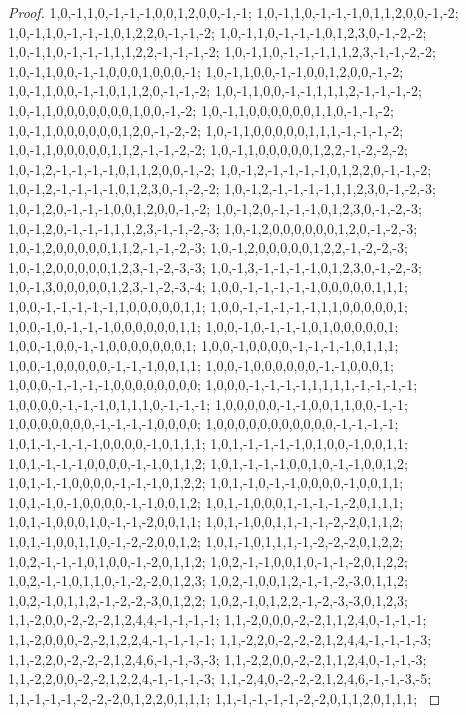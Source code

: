\documentclass{article}
\begin{document}
\begin{proof}
{{1,0,-1,1,0,-1,-1,-1,0,0,1,2,0,0,-1,-1; 1,0,-1,1,0,-1,-1,-1,0,1,1,2,0,0,-1,-2; 1,0,-1,1,0,-1,-1,-1,0,1,2,2,0,-1,-1,-2; 1,0,-1,1,0,-1,-1,-1,0,1,2,3,0,-1,-2,-2; 1,0,-1,1,0,-1,-1,-1,1,1,2,2,-1,-1,-1,-2; 1,0,-1,1,0,-1,-1,-1,1,1,2,3,-1,-1,-2,-2; 1,0,-1,1,0,0,-1,-1,0,0,0,1,0,0,0,-1; 1,0,-1,1,0,0,-1,-1,0,0,1,2,0,0,-1,-2; 1,0,-1,1,0,0,-1,-1,0,1,1,2,0,-1,-1,-2; 1,0,-1,1,0,0,-1,-1,1,1,1,2,-1,-1,-1,-2; 1,0,-1,1,0,0,0,0,0,0,0,1,0,0,-1,-2; 1,0,-1,1,0,0,0,0,0,0,1,1,0,-1,-1,-2;
1,0,-1,1,0,0,0,0,0,0,1,2,0,-1,-2,-2; 1,0,-1,1,0,0,0,0,0,1,1,1,-1,-1,-1,-2; 1,0,-1,1,0,0,0,0,0,1,1,2,-1,-1,-2,-2; 1,0,-1,1,0,0,0,0,0,1,2,2,-1,-2,-2,-2; 1,0,-1,2,-1,-1,-1,-1,0,1,1,2,0,0,-1,-2; 1,0,-1,2,-1,-1,-1,-1,0,1,2,2,0,-1,-1,-2; 1,0,-1,2,-1,-1,-1,-1,0,1,2,3,0,-1,-2,-2; 1,0,-1,2,-1,-1,-1,-1,1,1,2,3,0,-1,-2,-3; 1,0,-1,2,0,-1,-1,-1,0,0,1,2,0,0,-1,-2; 1,0,-1,2,0,-1,-1,-1,0,1,2,3,0,-1,-2,-3; 1,0,-1,2,0,-1,-1,-1,1,1,2,3,-1,-1,-2,-3; 1,0,-1,2,0,0,0,0,0,0,1,2,0,-1,-2,-3;
1,0,-1,2,0,0,0,0,0,1,1,2,-1,-1,-2,-3; 1,0,-1,2,0,0,0,0,0,1,2,2,-1,-2,-2,-3; 1,0,-1,2,0,0,0,0,0,1,2,3,-1,-2,-3,-3; 1,0,-1,3,-1,-1,-1,-1,0,1,2,3,0,-1,-2,-3; 1,0,-1,3,0,0,0,0,0,1,2,3,-1,-2,-3,-4; 1,0,0,-1,-1,-1,-1,-1,0,0,0,0,0,1,1,1; 1,0,0,-1,-1,-1,-1,-1,1,0,0,0,0,0,1,1; 1,0,0,-1,-1,-1,-1,-1,1,1,0,0,0,0,0,1; 1,0,0,-1,0,-1,-1,-1,0,0,0,0,0,0,1,1; 1,0,0,-1,0,-1,-1,-1,0,1,0,0,0,0,0,1; 1,0,0,-1,0,0,-1,-1,0,0,0,0,0,0,0,1; 1,0,0,-1,0,0,0,0,-1,-1,-1,-1,0,1,1,1;
1,0,0,-1,0,0,0,0,0,-1,-1,-1,0,0,1,1; 1,0,0,-1,0,0,0,0,0,0,-1,-1,0,0,0,1; 1,0,0,0,-1,-1,-1,-1,0,0,0,0,0,0,0,0; 1,0,0,0,-1,-1,-1,-1,1,1,1,1,-1,-1,-1,-1; 1,0,0,0,0,-1,-1,-1,0,1,1,1,0,-1,-1,-1; 1,0,0,0,0,0,-1,-1,0,0,1,1,0,0,-1,-1; 1,0,0,0,0,0,0,0,-1,-1,-1,-1,0,0,0,0; 1,0,0,0,0,0,0,0,0,0,0,0,-1,-1,-1,-1; 1,0,1,-1,-1,-1,-1,0,0,0,0,-1,0,1,1,1; 1,0,1,-1,-1,-1,-1,0,1,0,0,-1,0,0,1,1; 1,0,1,-1,-1,-1,0,0,0,0,-1,-1,0,1,1,2; 1,0,1,-1,-1,-1,0,0,1,0,-1,-1,0,0,1,2;
1,0,1,-1,-1,0,0,0,0,-1,-1,-1,0,1,2,2; 1,0,1,-1,0,-1,-1,0,0,0,0,-1,0,0,1,1; 1,0,1,-1,0,-1,0,0,0,0,-1,-1,0,0,1,2; 1,0,1,-1,0,0,0,1,-1,-1,-1,-2,0,1,1,1; 1,0,1,-1,0,0,0,1,0,-1,-1,-2,0,0,1,1; 1,0,1,-1,0,0,1,1,-1,-1,-2,-2,0,1,1,2; 1,0,1,-1,0,0,1,1,0,-1,-2,-2,0,0,1,2; 1,0,1,-1,0,1,1,1,-1,-2,-2,-2,0,1,2,2; 1,0,2,-1,-1,-1,0,1,0,0,-1,-2,0,1,1,2; 1,0,2,-1,-1,0,0,1,0,-1,-1,-2,0,1,2,2; 1,0,2,-1,-1,0,1,1,0,-1,-2,-2,0,1,2,3; 1,0,2,-1,0,0,1,2,-1,-1,-2,-3,0,1,1,2;
1,0,2,-1,0,1,1,2,-1,-2,-2,-3,0,1,2,2; 1,0,2,-1,0,1,2,2,-1,-2,-3,-3,0,1,2,3; 1,1,-2,0,0,-2,-2,-2,1,2,4,4,-1,-1,-1,-1; 1,1,-2,0,0,0,-2,-2,1,1,2,4,0,-1,-1,-1; 1,1,-2,0,0,0,-2,-2,1,2,2,4,-1,-1,-1,-1; 1,1,-2,2,0,-2,-2,-2,1,2,4,4,-1,-1,-1,-3; 1,1,-2,2,0,-2,-2,-2,1,2,4,6,-1,-1,-3,-3; 1,1,-2,2,0,0,-2,-2,1,1,2,4,0,-1,-1,-3; 1,1,-2,2,0,0,-2,-2,1,2,2,4,-1,-1,-1,-3; 1,1,-2,4,0,-2,-2,-2,1,2,4,6,-1,-1,-3,-5; 1,1,-1,-1,-1,-2,-2,-2,0,1,2,2,0,1,1,1; 1,1,-1,-1,-1,-1,-2,-2,0,1,1,2,0,1,1,1;
}}
\end{proof}
\end{document}
